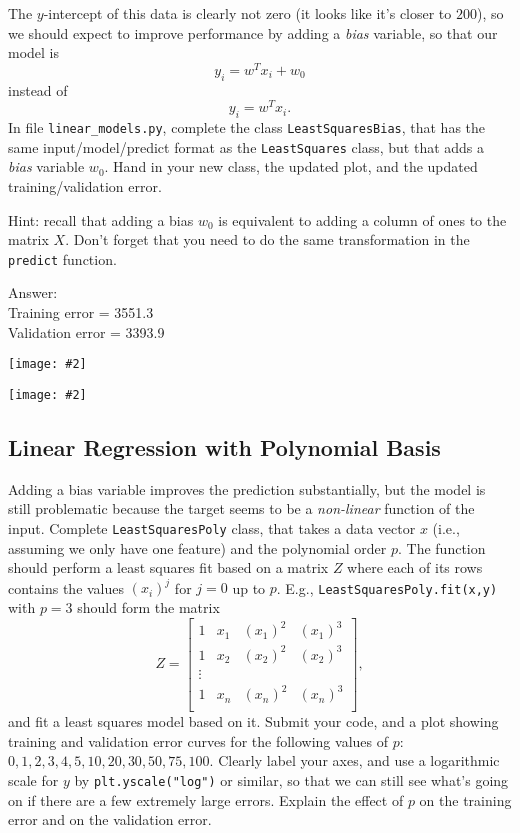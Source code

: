 \documentclass{article}
\newcommand{\blu}[1]{{\textcolor{blu}{#1}}}
\newcommand{\gre}[1]{\textcolor{gre}{#1}}
\newcommand\ans[1]{\par\gre{Answer: #1}}
\let\ask\blu
\newcommand{\centerfig}[2]{\begin{center}\texttt{[image: \#2]}\end{center}}
\begin{document}
The $y$-intercept of this data is clearly not zero (it looks like it's closer to $200$),
so we should expect to improve performance by adding a \emph{bias} variable, so that our model is
\[
y_i = w^Tx_i + w_0
\]
instead of
\[
y_i = w^Tx_i.
\]
\ask{In file \texttt{linear\string_models.py}, complete the class \texttt{LeastSquaresBias},
that has the same input/model/predict format as the \texttt{LeastSquares} class,
but that adds a \emph{bias} variable $w_0$. Hand in your new class, the updated plot,
and the updated training/validation error.}

Hint: recall that adding a bias $w_0$ is equivalent to adding a column of ones to the matrix $X$. Don't forget that you need to do the same transformation in the \texttt{predict} function.

\ans{\\
Training error = 3551.3 \\
Validation error     = 3393.9
}
\centerfig{0.8}{q4.1}
\centerfig{0.8}{figs/least_squares_yes_bias}

\pagebreak

\subsection{Linear Regression with Polynomial Basis}

Adding a bias variable improves the prediction substantially, but the model is still problematic because the target seems to be a \emph{non-linear} function of the input.
Complete \texttt{LeastSquaresPoly} class, that takes a data vector $x$ (i.e., assuming we only have one feature) and the polynomial order $p$. The function should perform a least squares fit based on a matrix $Z$ where each of its rows contains the values $(x_{i})^j$ for $j=0$ up to $p$. E.g., \texttt{LeastSquaresPoly.fit(x,y)}  with $p = 3$ should form the matrix
\[
Z =
\left[\begin{array}{cccc}
1 & x_1 & (x_1)^2 & (x_1)^3\\
1 & x_2 & (x_2)^2 & (x_2)^3\\
\vdots\\
1 & x_n & (x_n)^2 & (x_n)^3\\
\end{array}
\right],
\]
and fit a least squares model based on it.
\ask{Submit your code, and a plot showing training and validation error curves for the following values of $p$: $0,1,2,3,4,5,10,20,30,50,75,100$. Clearly label your axes, and use a logarithmic scale for $y$ by \texttt{plt.yscale("log")} or similar, so that we can still see what's going on if there are a few extremely large errors. Explain the effect of $p$ on the training error and on the validation error.}
\end{document}
